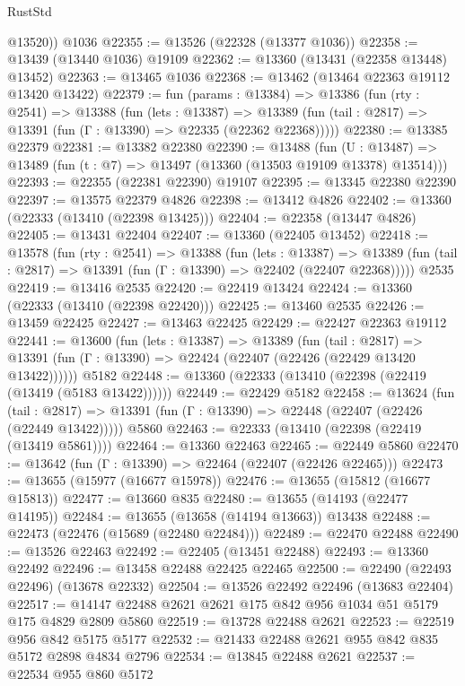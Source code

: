 \begin{lexlean}{RustStd}
\begin{coremodule}
        @13520))
    @1036
@22355 := @13526 (@22328 (@13377 @1036))
@22358 := @13439 (@13440 @1036) @19109
@22362 := @13360 (@13431 (@22358 @13448) @13452)
@22363 := @13465 @1036
@22368 := @13462 (@13464 @22363 @19112 @13420 @13422)
@22379 := fun (params : @13384) =>
  @13386
    (fun (rty : @2541) =>
    @13388
      (fun (lets : @13387) =>
      @13389 (fun (tail : @2817) => @13391 (fun (Γ : @13390) => @22335 (@22362 @22368)))))
@22380 := @13385 @22379
@22381 := @13382 @22380
@22390 := @13488
    (fun (U : @13487) => @13489 (fun (t : @7) => @13497 (@13360 (@13503 @19109 @13378) @13514)))
@22393 := @22355 (@22381 @22390) @19107
@22395 := @13345 @22380 @22390
@22397 := @13575 @22379 @4826
@22398 := @13412 @4826
@22402 := @13360 (@22333 (@13410 (@22398 @13425)))
@22404 := @22358 (@13447 @4826)
@22405 := @13431 @22404
@22407 := @13360 (@22405 @13452)
@22418 := @13578
    (fun (rty : @2541) =>
    @13388
      (fun (lets : @13387) =>
      @13389 (fun (tail : @2817) => @13391 (fun (Γ : @13390) => @22402 (@22407 @22368)))))
    @2535
@22419 := @13416 @2535
@22420 := @22419 @13424
@22424 := @13360 (@22333 (@13410 (@22398 @22420)))
@22425 := @13460 @2535
@22426 := @13459 @22425
@22427 := @13463 @22425
@22429 := @22427 @22363 @19112
@22441 := @13600
    (fun (lets : @13387) =>
    @13389
      (fun (tail : @2817) =>
      @13391 (fun (Γ : @13390) => @22424 (@22407 (@22426 (@22429 @13420 @13422))))))
    @5182
@22448 := @13360 (@22333 (@13410 (@22398 (@22419 (@13419 (@5183 @13422))))))
@22449 := @22429 @5182
@22458 := @13624
    (fun (tail : @2817) => @13391 (fun (Γ : @13390) => @22448 (@22407 (@22426 (@22449 @13422)))))
    @5860
@22463 := @22333 (@13410 (@22398 (@22419 (@13419 @5861))))
@22464 := @13360 @22463
@22465 := @22449 @5860
@22470 := @13642 (fun (Γ : @13390) => @22464 (@22407 (@22426 @22465)))
@22473 := @13655 (@15977 (@16677 @15978))
@22476 := @13655 (@15812 (@16677 @15813))
@22477 := @13660 @835
@22480 := @13655 (@14193 (@22477 @14195))
@22484 := @13655 (@13658 (@14194 @13663)) @13438
@22488 := @22473 (@22476 (@15689 (@22480 @22484)))
@22489 := @22470 @22488
@22490 := @13526 @22463
@22492 := @22405 (@13451 @22488)
@22493 := @13360 @22492
@22496 := @13458 @22488 @22425 @22465
@22500 := @22490 (@22493 @22496) (@13678 @22332)
@22504 := @13526 @22492 @22496 (@13683 @22404)
@22517 := @14147 @22488 @2621 @2621 @175 @842 @956 @1034 @51 @5179 @175 @4829 @2809 @5860
@22519 := @13728 @22488 @2621
@22523 := @22519 @956 @842 @5175 @5177
@22532 := @21433 @22488 @2621 @955 @842 @835 @5172 @2898 @4834 @2796
@22534 := @13845 @22488 @2621
@22537 := @22534 @955 @860 @5172

\end{coremodule}
\end{lexlean}
